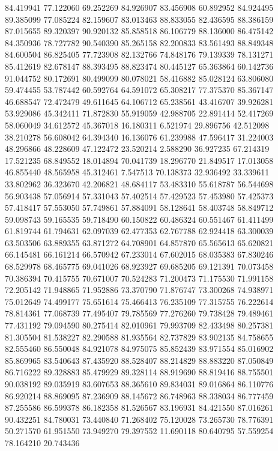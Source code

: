 84.419941
77.122060
69.252269
84.926907
83.456908
60.892952
84.924495
89.385099
77.085224
82.159607
83.013463
88.833055
82.436595
88.386159
87.015655
89.320397
90.920132
85.858518
86.106779
88.136000
86.475142
84.350936
78.727782
90.540390
85.265158
82.200833
83.561493
88.849348
84.600504
86.825405
77.723908
82.132766
74.848176
79.139339
78.131271
85.412619
82.678147
88.393495
88.823474
80.445127
65.363864
60.142736
91.044752
80.172691
80.499099
80.078021
58.416882
85.028124
63.806080
59.474455
53.787442
60.592764
64.591072
65.308217
77.375370
85.367147
46.688547
72.472479
49.611645
64.106712
65.238561
43.416707
39.926281
53.929086
45.342411
71.872830
55.919059
42.988705
22.891414
52.417269
58.060049
34.612572
45.367018
16.180311
6.521974
29.896756
42.512098
38.210278
56.608042
64.394340
16.136076
61.239988
47.596417
31.224003
48.296866
48.228609
47.122472
23.520214
2.588290
36.927235
67.214319
17.521235
68.849552
18.014894
70.041739
18.296770
21.849517
17.013058
46.855440
48.565958
45.312461
7.547513
70.138373
32.936492
33.339611
33.802962
36.323670
42.206821
48.684117
53.483310
55.618787
56.544698
56.903438
57.056914
57.331043
57.402514
57.429523
57.453980
57.425373
57.418417
57.553050
57.749861
57.884091
58.128641
58.403748
58.849712
59.098743
59.165535
59.718490
60.150822
60.486324
60.551467
61.411499
61.819744
61.794631
62.097039
62.477353
62.767788
62.924418
63.300039
63.503506
63.889355
63.871272
64.708901
64.857870
65.565613
65.620821
66.145481
66.161214
66.570942
67.233014
67.602015
68.035383
67.830246
68.529978
68.465775
69.041026
68.923927
69.685205
69.121391
70.073458
70.386394
70.415755
70.671007
70.524283
71.200473
71.175530
71.991158
72.205142
71.948865
71.952886
73.370790
71.876747
73.300268
74.938971
75.012649
74.499177
75.651614
75.466413
76.235109
77.315755
76.222614
78.814361
77.068739
77.495407
79.785569
77.276260
79.738428
79.489461
77.431192
79.094590
80.275414
82.010961
79.993709
82.433498
80.257381
81.305504
81.538227
82.290588
81.935564
82.737829
83.902135
84.758655
82.555460
86.550048
84.921078
84.975075
85.852439
83.971554
85.016902
85.869965
83.540643
87.435920
88.528407
88.214829
88.883220
87.050849
86.716222
89.328883
85.479929
89.328114
88.919690
88.819416
88.755501
90.038192
89.035919
83.607653
88.365610
89.834031
89.016864
86.110776
86.920214
88.869095
87.236909
88.145672
86.748963
88.338034
86.777459
87.255586
86.599378
86.182358
81.526567
83.196931
84.421550
87.016261
90.432251
84.780031
73.440840
71.268402
75.120028
73.265730
78.776391
50.271570
61.951550
73.949270
79.397552
11.690118
80.640795
57.559254
78.164210
20.743436

